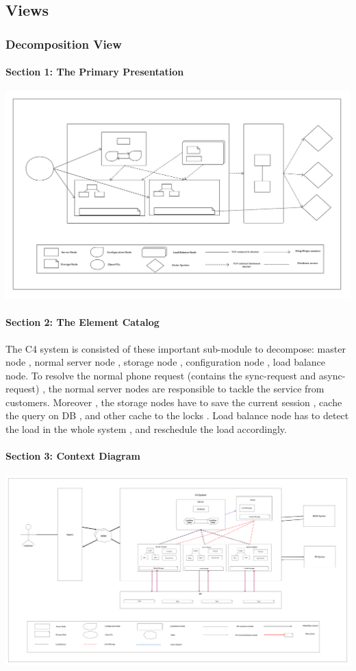 \documentclass{article}
\begin{document}
	\subsection{Views}
		\subsubsection{Decomposition View} 
			\paragraph{Section 1: The Primary Presentation}
			\begin{center}
			\includegraphics[scale=0.15]{decom_section1.png}
			\end{center}
			\paragraph{Section 2: The Element Catalog}
			The C4 system is consisted of these important sub-module to decompose:  master node , normal server node , storage node , configuration node , load balance node. To resolve the normal phone request (contains the sync-request and async-request) , the normal server nodes are responsible to tackle the service from customers. Moreover , the storage nodes have to save the current session , cache the query on DB , and other cache to the locks . Load balance node has to detect the load in the whole system , and reschedule the load accordingly. 
			\paragraph{Section 3: Context Diagram}
			\begin{center}
			\includegraphics[scale=0.05]{decom_section2.png}
			\end{center}
\end{document}
